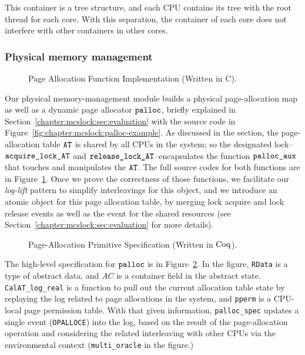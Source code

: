 This container is a tree structure, and each CPU contains its tree with the root thread for each core. 
With this separation, the container of each core does not interfere with other containers in other cores. 

\subsubsection{Physical memory management} 
\begin{figure}
 
\caption{Page Allocation Function Implementation (Written in C).}
\label{fig:chapter:certikos:palloc-in-c}
\end{figure}
Our physical memory-management module builds a physical page-allocation map as well as a dynamic page allocator ${\mathrm{\texttt{palloc}}}$, briefly explained 
in Section~\ref{chapter:mcslock:sec:evaluation} with the source code in Figure~\ref{fig:chapter:mcslock:palloc-example}.
As discussed in the section, the page-allocation table ${\mathrm{\texttt{AT}}}$ is shared by 
all CPUs in the system; so
the designated lock--${\mathrm{\texttt{acquire\_lock\_AT}}}$ and  ${\mathrm{\texttt{release\_lock\_AT}}}$--encapsulates the function ${\mathrm{\texttt{palloc\_aux}}}$ that touches and manipulates the ${\mathrm{\texttt{AT}}}$.
The full source codes for both functions are in Figure~\ref{fig:chapter:certikos:palloc-in-c}.
Once we prove  the correctness of those functions, we facilitate 
our \textit{log-lift} pattern to simplify  interleavings for this object,
and we introduce 
an atomic object for this page allocation table, by merging  lock acquire and lock release events as well as 
the event for the shared resources  (see Section~\ref{chapter:mcslock:sec:evaluation} for more details).
\begin{figure}
 
\caption{Page-Allocation Primitive Specification (Written in $\mathrm{Coq}$).}
\label{fig:chapter:certikos:palloc-in-coq}
\end{figure}
The high-level specification for ${\mathrm{\texttt{palloc}}}$ is in Figure~\ref{fig:chapter:certikos:palloc-in-coq}.
In the figure, \lstinline$RData$ is a type of abstract data, and $AC$ is a container field in the abstract state.
\lstinline$CalAT_log_real$ is a function to pull out the current allocation table state by replaying the log
related to page allocations in the system, and \lstinline$pperm$ is a CPU-local page permission table. 
With that given information, \lstinline$palloc_spec$ updates a single event (\lstinline$OPALLOCE$) into the log, based on the result of the page-allocation operation and considering the related interleaving with other CPUs via the environmental context (\lstinline$multi_oracle$ in the figure.)
